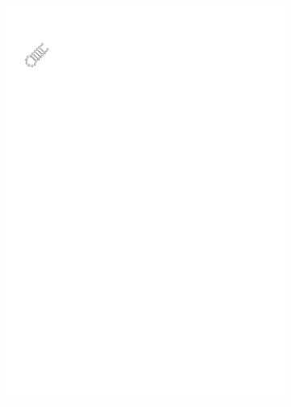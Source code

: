 \begin{figure}
\begin{subfigure}{\wi}
    \includegraphics[trim=1cm 24.5cm 17.5cm 2.5cm]{../img/alg/insert/1/circle-small}
  \end{subfigure}
  \begin{subfigure}{\wi}

\end{subfigure}
\end{figure}
